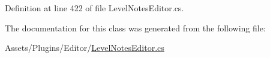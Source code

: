 Definition at line 422 of file Level\+Notes\+Editor.\+cs.



The documentation for this class was generated from the following file\+:\begin{DoxyCompactItemize}
\item 
Assets/\+Plugins/\+Editor/\mbox{\hyperlink{_level_notes_editor_8cs}{Level\+Notes\+Editor.\+cs}}\end{DoxyCompactItemize}
